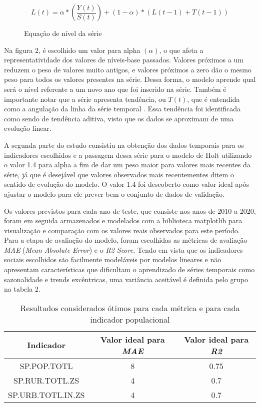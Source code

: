 \begin{figure}[h]
    \centering
    \begin{equation}
        L(t) = \alpha * (\frac{Y(t)}{S(t)}) + (1 - \alpha) * (L(t-1) + T(t-1))
    \end{equation}
    \caption{Equação de nível da série}
\end{figure}

Na figura 2, é escolhido um valor para alpha $(\alpha)$, o que afeta a representatividade dos 
valores de níveis-base passados. Valores próximos a um reduzem o peso de valores muito antigos, 
e valores próximos a zero dão o mesmo peso para todos os valores presentes na série. 
Dessa forma, o modelo aprende qual será o nível referente a um novo ano que foi inserido 
na série. Também é importante notar que a série apresenta tendência, ou $T(t)$, que é entendida 
como a angulação da linha da série temporal \cite{WIENER:8}. Essa tendência foi identificada 
como sendo de tendência aditiva, visto que os dados se aproximam de uma evolução linear.

A segunda parte do estudo consistiu na obtenção dos dados temporais para os indicadores 
escolhidos e a passagem dessa série para o modelo de Holt utilizando o valor 1.4 para 
alpha a fim de dar um peso maior para valores mais recentes da série, já que é desejável 
que valores observados mais recentementes ditem o sentido de evolução do modelo. 
O valor 1.4 foi descoberto como valor ideal após ajustar o modelo para ele prever 
bem o conjunto de dados de validação.

Os valores previstos para cada ano de teste, que consiste nos anos de 2010 a 2020, 
foram em seguida armazenados e modelados com a biblioteca matplotlib para visualização 
e comparação com os valores reais observados para este período. Para a etapa de avaliação 
do modelo, foram escolhidas as métricas de avaliação \emph{MAE} (\emph{Mean Absolute Error}) e o \emph{R2 Score}. 
Tendo em vista que os indicadores sociais escolhidos são facilmente modeláveis por modelos lineares 
e não apresentam características que dificultam o aprendizado de séries temporais como sazonalidade 
e trends excêntricas, uma variância aceitável é definida pelo grupo na tabela 2.

\begin{table}[h]
    \centering
    \begin{tabular}{|c|c|c|}
        \hline
        Indicador & Valor ideal para \emph{MAE} & Valor ideal para \emph{R2} \\
        \hline
        SP.POP.TOTL & 8 & 0.75 \\ 
        \hline
        SP.RUR.TOTL.ZS & 4 & 0.7 \\
        \hline
        SP.URB.TOTL.IN.ZS & 4 & 0.7 \\
        \hline
    \end{tabular}
    \caption{Resultados considerados ótimos para cada métrica e para cada indicador populacional}
\end{table}